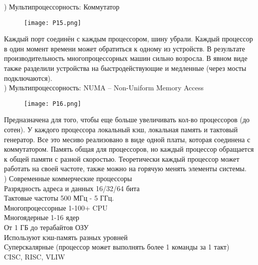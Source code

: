 ) Мультипроцессорность: Коммутатор \\
\begin{figure}[H]
    \centering
    \texttt{[image: P15.png]}
\end{figure}
\noindent Каждый порт соединён с каждым процессором, шину убрали. Каждый процессор в один момент времени может обратиться к одному из устройств. В результате производительность многопроцессорных машин сильно возросла. В явном виде также разделили устройства на быстродействующие и медленные (через мосты подключаются). \\

) Мультипроцессорность: NUMA – Non-Uniform  
Memory Access \\
\begin{figure}[H]
    \centering
    \texttt{[image: P16.png]}
\end{figure}
\noindent Предназначена для того, чтобы еще больше увеличивать кол-во процессоров (до сотен). У каждого процессора локальный кэш, локальная память и тактовый генератор. Все это месиво реализовано в виде одной платы, которая соединена с коммутатором. Память общая для процессоров, но каждый процессор обращается к общей памяти с разной скоростью. Теоретически каждый процессор может работать на своей частоте, также можно на горячую менять элементы системы. \\

) Современные коммерческие процессоры \\
Разрядность адреса и данных 16/32/64 бита  \\
Тактовые частоты 500 МГц - 5 ГГц. \\
Многопроцессорные 1-100+ CPU \\
Многоядерные 1-16 ядер \\
От 1 ГБ до терабайтов ОЗУ \\
Используют кэш-память разных уровней \\
Суперскалярные (процессор может выполнять более 1 команды за 1 такт) \\
CISC, RISC, VLIW \\


